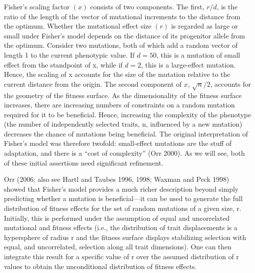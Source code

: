 \documentclass{article}
\begin{document}
Fisher’s scaling factor  $ (x) $ consists of two components. The first,  $ r/d $, is the ratio of the length of the vector of mutational increments to the distance from the optimum. Whether the mutational effect size  $ (r) $ is regarded as large or small under Fisher’s model depends on the distance of its progenitor allele from the optimum. Consider two mutations, both of which add a random vector of length 1 to the current phenotypic value. If  $ d = 50 $, this is a mutation of small effect from the standpoint of x, while if  $ d = 2 $, this is a large-effect mutation. Hence, the scaling of x accounts for the size of the mutation relative to the current distance from the origin. The second component of  $ x $,  $ \sqrt{n}/2 $, accounts for the geometry of the fitness surface. As the dimensionality of the fitness surface increases, there are increasing numbers of constraints on a random mutation required for it to be beneficial. Hence, increasing the complexity of the phenotype (the number of independently selected traits, n, influenced by a new mutation) decreases the chance of mutations being beneficial. The original interpretation of Fisher’s model was therefore twofold: small-effect mutations are the stuff of adaptation, and there is a “cost of complexity” (Orr 2000). As we will see, both of these initial assertions need significant refinement.

Orr (2006; also see Hartl and Taubes 1996, 1998; Waxman and Peck 1998) showed that Fisher's model provides a much richer description beyond simply predicting whether a mutation is beneficial—it can be used to generate the full distribution of fitness effects for the set of random mutations of a given size, r. Initially, this is performed under the assumption of equal and uncorrelated mutational and fitness effects (i.e., the distribution of trait displacements is a hypersphere of radius r and the fitness surface displays stabilizing selection with equal, and uncorrelated, selection along all trait dimensions). One can then integrate this result for a specific value of r over the assumed distribution of r values to obtain the unconditional distribution of fitness effects.
\end{document}

